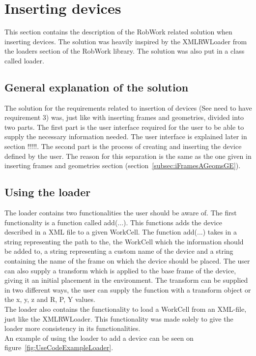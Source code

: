 \section{Inserting devices}
This section contains the description of the RobWork related solution when inserting devices. The solution was heavily inspired by the XMLRWLoader from the loaders section of the RobWork library. The solution was also put in a class called loader.

\subsection{General explanation of the solution}
The solution for the requirements related to insertion of devices (See need to have requirement 3) was, just like with inserting frames and geometries, divided into two parts. The first part is the user interface required for the user to be able to supply the necessary information needed. The user interface is explained later in section !!!!!. The second part is the process of creating and inserting the device defined by the user. The reason for this separation is the same as the one given in inserting frames and geometries section (section~\ref{subsec:iFramesAGeomsGE}).

\subsection{Using the loader}
The loader contains two functionalities the user should be aware of. The first functionality is a function called add(...). This functions adds the device described in a XML file to a given WorkCell. The function add(...) takes in a string representing the path to the, the WorkCell which the information should be added to, a string representing a custom name of the device and a string containing the name of the frame on which the device should be placed. The user can also supply a transform which is applied to the base frame of the device, giving it an initial placement in the environment. The transform can be supplied in two different ways, the user can supply the function with a transform object or the x, y, z and R, P, Y values.\\
The loader also contains the functionality to load a WorkCell from an XML-file, just like the XMLRWLoader. This functionality was made solely to give the loader more consistency in its functionalities.\\
An example of using the loader to add a device can be seen on figure~\ref{fig:UseCodeExampleLoader}.

